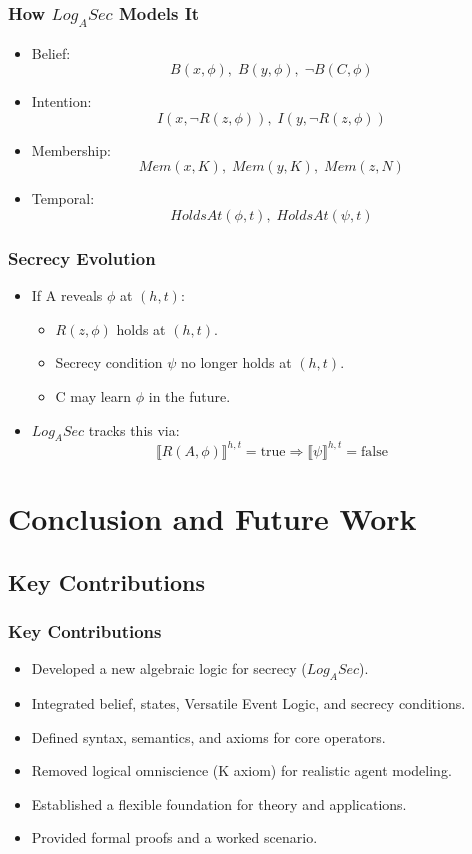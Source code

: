 \documentclass[aspectratio=169]{beamer}
\begin{document}
\begin{frame}
\frametitle{How $Log_ASec$ Models It}
\begin{itemize}
    \Large 
    \item Belief:
    \[
    B(x, \phi), \; B(y, \phi), \; \neg B(C, \phi)
    \]
    \item Intention:
    \[
    I(x, \neg R(z, \phi)), \; I(y, \neg R(z, \phi))
    \]
    \item Membership:
    \[
    Mem(x, K), \; Mem(y, K), \; Mem(z, N)
    \]
    \item Temporal:
    \[
    HoldsAt(\phi, t), \; HoldsAt(\psi, t)
    \]
\end{itemize}
\end{frame}

\begin{frame}
\frametitle{Secrecy Evolution}
\begin{itemize}
    \Large
    \item If A reveals $\phi$ at $(h,t)$:
    \begin{itemize}
        \Large
        \item $R(z, \phi)$ holds at $(h,t)$.
        \item Secrecy condition $\psi$ no longer holds at $(h,t)$.
        \item C may learn $\phi$ in the future.
    \end{itemize}
    \item $Log_ASec$ tracks this via:
    \[
    \llbracket R(A, \phi) \rrbracket^{h,t} = \text{true}
    \Longrightarrow 
    \llbracket \psi \rrbracket^{h,t} = \text{false}
    \]
\end{itemize}
\end{frame}


\section{Conclusion and Future Work}

\subsection{Key Contributions}
\begin{frame}
\frametitle{Key Contributions}
\begin{itemize}
    \Large
    \item Developed a new algebraic logic for secrecy ($Log_ASec$).
    \item Integrated belief, states, Versatile Event Logic, and secrecy conditions.
    \item Defined syntax, semantics, and axioms for core operators.
    \item Removed logical omniscience (K axiom) for realistic agent modeling.
    \item Established a flexible foundation for theory and applications.
    \item Provided formal proofs and a worked scenario.
\end{itemize}
\end{frame}
\end{document}

